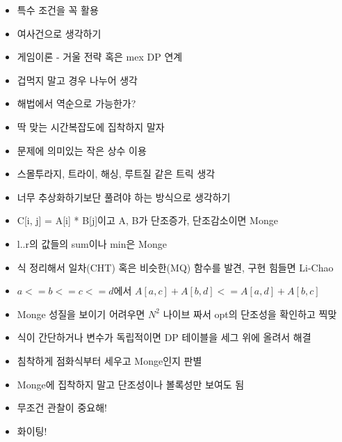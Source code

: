 \documentclass[landscape, 10pt, a4paper, oneside, twocolumn]{extarticle}
\begin{document}
\begin{itemize}
    \item 특수 조건을 꼭 활용
    \item 여사건으로 생각하기
    \item 게임이론 - 거울 전략 혹은 mex DP 연계
    \item 겁먹지 말고 경우 나누어 생각
    \item 해법에서 역순으로 가능한가?
    \item 딱 맞는 시간복잡도에 집착하지 말자
    \item 문제에 의미있는 작은 상수 이용
    \item 스몰투라지, 트라이, 해싱, 루트질 같은 트릭 생각
    \item 너무 추상화하기보단 풀려야 하는 방식으로 생각하기
\end{itemize}

\begin{itemize}
    \item C[i, j] = A[i] * B[j]이고 A, B가 단조증가, 단조감소이면 Monge
    \item l..r의 값들의 sum이나 min은 Monge

    \item 식 정리해서 일차(CHT) 혹은 비슷한(MQ) 함수를 발견, 구현 힘들면 Li-Chao
    \item $a <= b <= c <= d$에서 $A[a,c] + A[b,d] <= A[a,d] + A[b,c]$
    \item Monge 성질을 보이기 어려우면 $N^2$ 나이브 짜서 opt의 단조성을 확인하고 찍맞
    \item 식이 간단하거나 변수가 독립적이면 DP 테이블을 세그 위에 올려서 해결
    \item 침착하게 점화식부터 세우고 Monge인지 판별
    \item Monge에 집착하지 말고 단조성이나 볼록성만 보여도 됨

    \item 무조건 관찰이 중요해!
    \item 화이팅!
\end{itemize}
\end{document}
